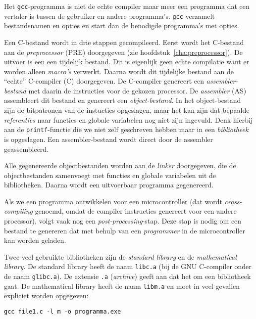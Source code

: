 Het \texttt{gcc}-programma is niet de echte compiler maar meer een programma dat een vertaler is tussen de gebruiker en andere programma's. \texttt{gcc} verzamelt bestandsnamen en opties en start dan de benodigde programma's met opties.

Een C-bestand wordt in drie stappen gecompileerd. Eerst wordt het C-bestand aan de \textsl{preprocessor} (PRE) doorgegeven (zie hoofdstuk~\ref{cha:preprocessor}). De uitvoer is een een tijdelijk bestand. Dit is eigenlijk geen echte compilatie want er worden alleen \textsl{macro's} verwerkt. Daarna wordt dit tijdelijke bestand aan de ``echte'' C-compiler (C) doorgegeven. De C-compiler genereert een \textsl{assembler-bestand} met daarin de instructies voor de gekozen processor. De \textsl{assembler} (AS) assembleert dit bestand en genereert een \textsl{object-bestand}. In het object-bestand zijn de bitpatronen van de instucties opgeslagen, maar het kan zijn dat bepaalde \textsl{referenties} naar functies en globale variabelen nog niet zijn ingevuld. Denk hierbij aan de \texttt{printf}-functie die we niet zelf geschreven hebben maar in een \textsl{bibliotheek} is opgeslagen. Een assembler-bestand wordt direct door de assembler geassembleerd.

Alle gegenereerde objectbestanden worden aan de \textsl{linker} doorgegeven, die de objectbestanden samenvoegt met functies en globale variabelen uit de bibliotheken. Daarna wordt een uitvoerbaar programma gegenereerd.

Als we een programma ontwikkelen voor een microcontroller (dat wordt \textsl{cross-compiling} genoemd, omdat de compiler instructies genereert voor een andere processor), volgt vaak nog een \textsl{post-processing}-stap. Deze stap is nodig om een bestand te genereren dat met behulp van een \textsl{programmer} in de microcontroller kan worden geladen.


Twee veel gebruikte bibliotheken zijn de \textsl{standard library} en de \textsl{mathematical library}. De standard library heeft de naam \texttt{libc.a} (bij de GNU C-compiler onder de naam \texttt{glibc.a}). De extensie \texttt{.a} (\textsl{archive}) geeft aan dat het om een bibliotheek gaat. De mathematical library heeft de naam \texttt{libm.a} en moet in veel gevallen expliciet worden opgegeven:

\hspace*{1em}\texttt{gcc file1.c -l m -o programma.exe}

